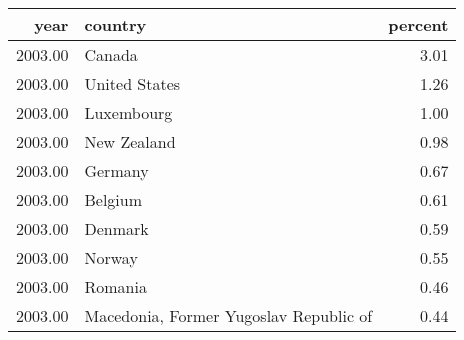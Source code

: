 \begin{table}[ht]
\centering
\begin{tabular}{rlr}
  \hline
year & country & percent \\ 
  \hline
2003.00 & Canada & 3.01 \\ 
  2003.00 & United States & 1.26 \\ 
  2003.00 & Luxembourg & 1.00 \\ 
  2003.00 & New Zealand & 0.98 \\ 
  2003.00 & Germany & 0.67 \\ 
  2003.00 & Belgium & 0.61 \\ 
  2003.00 & Denmark & 0.59 \\ 
  2003.00 & Norway & 0.55 \\ 
  2003.00 & Romania & 0.46 \\ 
  2003.00 & Macedonia, Former Yugoslav Republic of & 0.44 \\ 
   \hline
\end{tabular}
\end{table}
